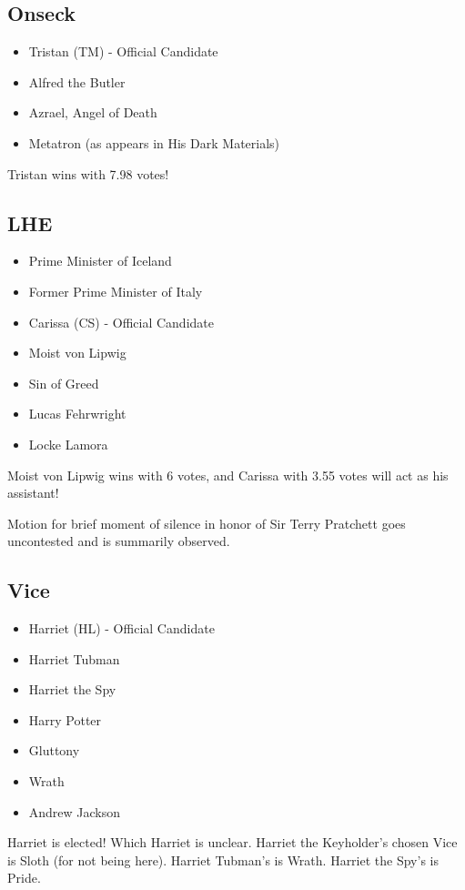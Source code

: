 \documentclass[10pt]{article}
\begin{document}
\subsection*{Onseck}
\begin{itemize}
\item Tristan (TM) - Official Candidate
\item Alfred the Butler
\item Azrael, Angel of Death
\item Metatron (as appears in His Dark Materials)
\end{itemize}

Tristan wins with 7.98 votes!

\subsection*{LHE}
\begin{itemize}
\item Prime Minister of Iceland
\item Former Prime Minister of Italy
\item Carissa (CS) - Official Candidate
\item Moist von Lipwig
\item Sin of Greed
\item Lucas Fehrwright
\item Locke Lamora
\end{itemize}

Moist von Lipwig wins with 6 votes, and Carissa with 3.55 votes will act as his assistant!

Motion for brief moment of silence in honor of Sir Terry Pratchett goes uncontested and is summarily observed.

\subsection*{Vice}
\begin{itemize}
\item Harriet (HL) - Official Candidate
\item Harriet Tubman
\item Harriet the Spy
\item Harry Potter
\item Gluttony
\item Wrath
\item Andrew Jackson
\end{itemize}

Harriet is elected! Which Harriet is unclear.
Harriet the Keyholder's chosen Vice is Sloth (for not being here).
Harriet Tubman's is Wrath.
Harriet the Spy's is Pride.
\end{document}
